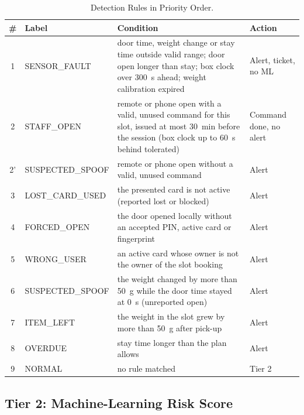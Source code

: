 \documentclass[journal,onecolumn]{IEEEtran}
\begin{document}
\begin{table}[!htbp]
\renewcommand{\arraystretch}{1.02}
\centering
\small
\caption{Detection Rules in Priority Order.}
\label{tab:rules}
\vspace{5pt}
\begin{tabular}{c l p{8.6cm} l}
\hline
\# & Label & Condition & Action \\
\hline
1 & SENSOR\_FAULT & door time, weight change or stay time outside valid range; door open longer than stay; box clock over 300~s ahead; weight calibration expired & Alert, ticket, no ML \\
2 & STAFF\_OPEN & remote or phone open with a valid, unused command for this slot, issued at most 30~min before the session (box clock up to 60~s behind tolerated) & Command done, no alert \\
2' & SUSPECTED\_SPOOF & remote or phone open without a valid, unused command & Alert \\
3 & LOST\_CARD\_USED & the presented card is not active (reported lost or blocked) & Alert \\
4 & FORCED\_OPEN & the door opened locally without an accepted PIN, active card or fingerprint & Alert \\
5 & WRONG\_USER & an active card whose owner is not the owner of the slot booking & Alert \\
6 & SUSPECTED\_SPOOF & the weight changed by more than 50~g while the door time stayed at 0~s (unreported open) & Alert \\
7 & ITEM\_LEFT & the weight in the slot grew by more than 50~g after pick-up & Alert \\
8 & OVERDUE & stay time longer than the plan allows & Alert \\
9 & NORMAL & no rule matched & Tier 2 \\
\hline
\end{tabular}
\end{table}

\subsection{Tier 2: Machine-Learning Risk Score}
\end{document}
